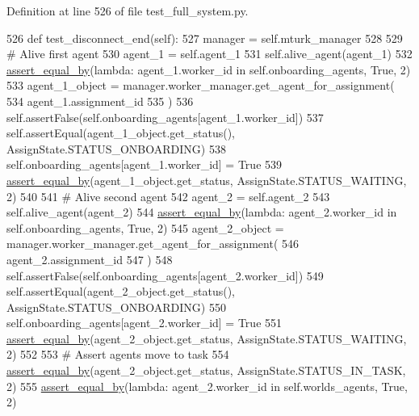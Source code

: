 Definition at line 526 of file test\+\_\+full\+\_\+system.\+py.


\begin{DoxyCode}
526     \textcolor{keyword}{def }test\_disconnect\_end(self):
527         manager = self.mturk\_manager
528 
529         \textcolor{comment}{# Alive first agent}
530         agent\_1 = self.agent\_1
531         self.alive\_agent(agent\_1)
532         \hyperlink{namespaceparlai_1_1mturk_1_1core_1_1test_1_1test__full__system_a0b463246d35658a2e422010f13dcf819}{assert\_equal\_by}(\textcolor{keyword}{lambda}: agent\_1.worker\_id \textcolor{keywordflow}{in} self.onboarding\_agents, \textcolor{keyword}{True}, 2)
533         agent\_1\_object = manager.worker\_manager.get\_agent\_for\_assignment(
534             agent\_1.assignment\_id
535         )
536         self.assertFalse(self.onboarding\_agents[agent\_1.worker\_id])
537         self.assertEqual(agent\_1\_object.get\_status(), AssignState.STATUS\_ONBOARDING)
538         self.onboarding\_agents[agent\_1.worker\_id] = \textcolor{keyword}{True}
539         \hyperlink{namespaceparlai_1_1mturk_1_1core_1_1test_1_1test__full__system_a0b463246d35658a2e422010f13dcf819}{assert\_equal\_by}(agent\_1\_object.get\_status, AssignState.STATUS\_WAITING, 2)
540 
541         \textcolor{comment}{# Alive second agent}
542         agent\_2 = self.agent\_2
543         self.alive\_agent(agent\_2)
544         \hyperlink{namespaceparlai_1_1mturk_1_1core_1_1test_1_1test__full__system_a0b463246d35658a2e422010f13dcf819}{assert\_equal\_by}(\textcolor{keyword}{lambda}: agent\_2.worker\_id \textcolor{keywordflow}{in} self.onboarding\_agents, \textcolor{keyword}{True}, 2)
545         agent\_2\_object = manager.worker\_manager.get\_agent\_for\_assignment(
546             agent\_2.assignment\_id
547         )
548         self.assertFalse(self.onboarding\_agents[agent\_2.worker\_id])
549         self.assertEqual(agent\_2\_object.get\_status(), AssignState.STATUS\_ONBOARDING)
550         self.onboarding\_agents[agent\_2.worker\_id] = \textcolor{keyword}{True}
551         \hyperlink{namespaceparlai_1_1mturk_1_1core_1_1test_1_1test__full__system_a0b463246d35658a2e422010f13dcf819}{assert\_equal\_by}(agent\_2\_object.get\_status, AssignState.STATUS\_WAITING, 2)
552 
553         \textcolor{comment}{# Assert agents move to task}
554         \hyperlink{namespaceparlai_1_1mturk_1_1core_1_1test_1_1test__full__system_a0b463246d35658a2e422010f13dcf819}{assert\_equal\_by}(agent\_2\_object.get\_status, AssignState.STATUS\_IN\_TASK, 2)
555         \hyperlink{namespaceparlai_1_1mturk_1_1core_1_1test_1_1test__full__system_a0b463246d35658a2e422010f13dcf819}{assert\_equal\_by}(\textcolor{keyword}{lambda}: agent\_2.worker\_id \textcolor{keywordflow}{in} self.worlds\_agents, \textcolor{keyword}{True}, 2)

\end{DoxyCode}
